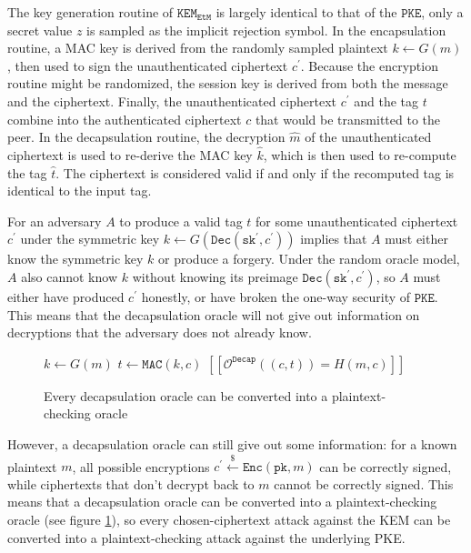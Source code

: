 \documentclass[journal=tches,submission]{iacrtrans}
\newcommand{\pke}{\texttt{PKE}}
\newcommand{\encrypt}{\texttt{Enc}}
\newcommand{\decrypt}{\texttt{Dec}}
\newcommand{\kem}{\texttt{KEM}}
\newcommand{\decap}{\texttt{Decap}}
\newcommand{\etm}{\texttt{EtM}}  %
\newcommand{\mac}{\texttt{MAC}}
\newcommand{\pk}{\texttt{pk}}
\newcommand{\sk}{\texttt{sk}}
\newcommand{\pco}{\texttt{PCO}}
\newcommand{\leftsample}{\stackrel{\$}{\leftarrow}}
\newcommand{\llbrack}{[\![}
\newcommand{\rrbrack}{]\!]}
\begin{document}
The key generation routine of $\kem_\etm$ is largely identical to that of the $\pke$, only a secret value $z$ is sampled as the implicit rejection symbol. In the encapsulation routine, a MAC key is derived from the randomly sampled plaintext $k \leftarrow G(m)$, then used to sign the unauthenticated ciphertext $c^\prime$. Because the encryption routine might be randomized, the session key is derived from both the message and the ciphertext. Finally, the unauthenticated ciphertext $c^\prime$ and the tag $t$ combine into the authenticated ciphertext $c$ that would be transmitted to the peer. In the decapsulation routine, the decryption $\hat{m}$ of the unauthenticated ciphertext is used to re-derive the MAC key $\hat{k}$, which is then used to re-compute the tag $\hat{t}$. The ciphertext is considered valid if and only if the recomputed tag is identical to the input tag.

For an adversary $A$ to produce a valid tag $t$ for some unauthenticated ciphertext $c^\prime$ under the symmetric key $k \leftarrow G(\decrypt(\sk^\prime, c^\prime))$ implies that $A$ must either know the symmetric key $k$ or produce a forgery. Under the random oracle model, $A$ also cannot know $k$ without knowing its preimage $\decrypt(\sk^\prime, c^\prime)$, so $A$ must either have produced $c^\prime$ honestly, or have broken the one-way security of $\pke$. This means that the decapsulation oracle will not give out information on decryptions that the adversary does not already know. 

\begin{figure}[H]
    \centering
    \begin{minipage}{0.6\textwidth}
    \begin{algorithm}[H]
        \caption*{$\pco(m, c)$}
        \begin{algorithmic}[1]
            \State $k \leftarrow G(m)$
            \State $t \leftarrow \mac(k, c)$
            \State \Return $\llbrack \mathcal{O}^\decap((c, t)) = H(m, c)\rrbrack$
        \end{algorithmic}
    \end{algorithm}
    \end{minipage}
    \caption{Every decapsulation oracle can be converted into a plaintext-checking oracle}\label{fig:pco-using-decap-oracle}
\end{figure}

However, a decapsulation oracle can still give out some information: for a known plaintext $m$, all possible encryptions $c^\prime \leftsample \encrypt(\pk, m)$ can be correctly signed, while ciphertexts that don't decrypt back to $m$ cannot be correctly signed. This means that a decapsulation oracle can be converted into a plaintext-checking oracle (see figure \ref{fig:pco-using-decap-oracle}), so every chosen-ciphertext attack against the KEM can be converted into a plaintext-checking attack against the underlying PKE.
\end{document}
